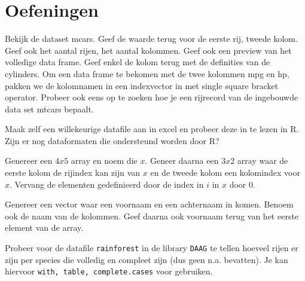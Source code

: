 

\pagebreak
\section{Oefeningen}
\begin{exercise}
Bekijk de dataset mcars. Geef de waarde terug voor de eerste rij, tweede kolom. Geef ook het aantal rijen, het aantal kolommen. Geef ook een preview van het volledige data frame. Geef enkel de kolom terug met de definities van de cylinders. Om een data frame te bekomen met de twee kolommen mpg en hp, pakken we de kolomnamen in een indexvector in met single square bracket operator. Probeer ook eens op te zoeken hoe je een rijrecord van de ingebouwde data set mtcars bepaalt.
\end{exercise}

\begin{exercise}
Maak zelf een willekeurige datafile aan in excel en probeer deze in te lezen in R. Zijn er nog dataformaten die ondersteund worden door R?
\end{exercise}



\begin{exercise}
	Genereer een $4x5$ array en noem die $x$. Geneer daarna een $3x2$ array waar de eerste kolom de rijindex kan zijn van $x$ en de tweede kolom een kolomindex voor $x$. Vervang de elementen gedefinieerd door de index in $i$ in $x$ door 0. 
\end{exercise}

\begin{exercise}
	Genereer een vector waar een voornaam en een achternaam in komen. Benoem ook de naam van de kolommen. Geef daarna ook voornaam terug van het eerste element van de array. 
\end{exercise}

\begin{exercise}
	Probeer voor de datafile \texttt{rainforest} in de library \texttt{DAAG} te tellen hoeveel rijen er zijn per species die volledig en compleet zijn (dus geen n.a. bevatten). Je kan hiervoor \texttt{with, table, complete.cases} voor gebruiken. 
\end{exercise}
